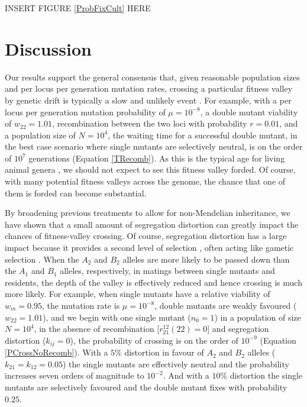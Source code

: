 \documentclass[review,3p,authoryear]{elsarticle}
\begin{document}
INSERT FIGURE \ref{ProbFixCult} HERE

\section{Discussion}

Our results support the general consensus that, given reasonable population sizes and per locus per generation mutation rates, crossing a particular fitness valley by genetic drift is typically a slow and unlikely event \citep{Crow1965,Bengtsson1976,Lande1979,Hedrick1981,Walsh1982,Lande1985a,Michalakis1996,Phillips1996,Coyne1997}.
For example, with a per locus per generation mutation probability of $\mu=10^{-8}$, a double mutant viability of $w_{22}=1.01$, recombination between the two loci with probability $r=0.01$, and a population size of $N=10^4$, the waiting time for a successful double mutant, in the best case scenario where single mutants are selectively neutral, is on the order of $10^7$ generations (Equation \ref{TRecomb}).
As this is the typical age for living animal genera \citep{VanValen1973,Lande1979}, we should not expect to see this fitness valley forded. 
Of course, with many potential fitness valleys across the genome, the chance that one of them is forded can become substantial.

By broadening previous treatments to allow for non-Mendelian inheritance, we have shown that a small amount of segregation distortion can greatly impact the chances of fitness-valley crossing.
Of course, segregation distortion has a large impact because it provides a second level of selection \citep{Sandler1957}, often acting like gametic selection \citep[but see][]{Hartl1970,Hartl1977}.
When the $A_2$ and $B_2$ alleles are more likely to be passed down than the $A_1$ and $B_1$ alleles, respectively, in matings between single mutants and residents, the depth of the valley is effectively reduced and hence crossing is much more likely.
For example, when single mutants have a relative viability of $w_{m}=0.95$, the mutation rate is $\mu=10^{-8}$, double mutants are weakly favoured ($w_{22}=1.01$), and we begin with one single mutant ($n_0=1$) in a population of size $N=10^4$, in the absence of recombination [$r_{21}^{12}(22)=0$] and segregation distortion ($k_{ij}=0$), the probability of crossing is on the order of $10^{-9}$ (Equation \ref{PCrossNoRecomb}).
With a $5\%$ distortion in favour of $A_2$ and $B_2$ alleles ($k_{21}=k_{12}=0.05$) the single mutants are effectively neutral and the probability increases seven orders of magnitude to $10^{-2}$.
And with a $10\%$ distortion the single mutants are selectively favoured and the double mutant fixes with probability $0.25$.
\end{document}
